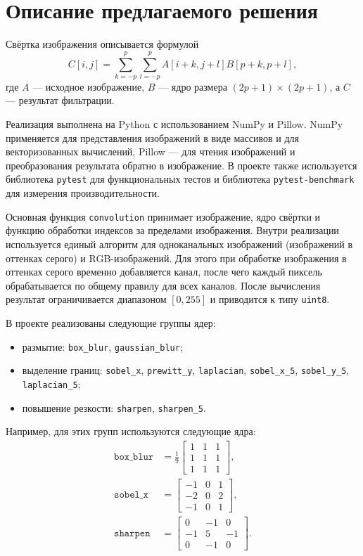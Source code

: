 \documentclass[a4paper]{article}
\begin{document}
\section{Описание предлагаемого решения}

Свёртка изображения описывается формулой
\[
    C[i,j] = \sum_{k=-p}^{p}\sum_{l=-p}^{p} A[i+k,j+l]B[p+k,p+l],
\]
где \(A\) --- исходное изображение, \(B\) --- ядро размера \((2p+1) \times (2p+1)\), а \(C\) --- результат фильтрации.

Реализация выполнена на Python с использованием NumPy и Pillow. NumPy применяется для представления изображений в виде массивов и для векторизованных вычислений, Pillow --- для чтения изображений и преобразования результата обратно в изображение. В проекте также используется библиотека \texttt{pytest} для функциональных тестов и библиотека \texttt{pytest-benchmark} для измерения производительности.

Основная функция \texttt{convolution} принимает изображение, ядро свёртки и функцию обработки индексов за пределами изображения. Внутри реализации используется единый алгоритм для одноканальных изображений (изображений в оттенках серого) и RGB-изображений. Для этого при обработке изображения в оттенках серого временно добавляется канал, после чего каждый пиксель обрабатывается по общему правилу для всех каналов. После вычисления результат ограничивается диапазоном \([0, 255]\) и приводится к типу \texttt{uint8}.

В проекте реализованы следующие группы ядер:
\begin{itemize}
    \item размытие: \texttt{box\_blur}, \texttt{gaussian\_blur};
    \item выделение границ: \texttt{sobel\_x}, \texttt{prewitt\_y}, \texttt{laplacian}, \texttt{sobel\_x\_5}, \texttt{sobel\_y\_5}, \texttt{laplacian\_5};
    \item повышение резкости: \texttt{sharpen}, \texttt{sharpen\_5}.
\end{itemize}

Например, для этих групп используются следующие ядра:
\begin{align*}
\texttt{box\_blur} &= \frac{1}{9} \begin{bmatrix}1 & 1 & 1 \\ 1 & 1 & 1 \\ 1 & 1 & 1\end{bmatrix},\\
\texttt{sobel\_x} &= \begin{bmatrix}-1 & 0 & 1 \\ -2 & 0 & 2 \\ -1 & 0 & 1\end{bmatrix},\\
\texttt{sharpen} &= \begin{bmatrix}0 & -1 & 0 \\ -1 & 5 & -1 \\ 0 & -1 & 0\end{bmatrix}.
\end{align*}
\end{document}
